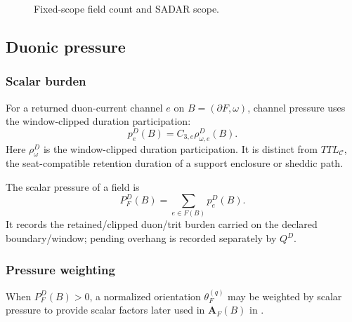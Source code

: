 \begin{figure}[H]
\centering
{}
\caption{Fixed-scope field count and SADAR scope.}
\label{fig:field-count}
\end{figure}


\subsection{Duonic pressure}
\label{sec:duonic-pressure-inertia}

\subsubsection{Scalar burden}
\label{subsec:duonic-pressure-scalar-burden}
\begin{definition}
For a returned duon-current channel \(e\) on \(B=(\partial F,\omega)\), channel pressure uses the window-clipped duration participation:
\[
p^D_e(B)=C_{3,e}\rho^D_{\omega,e}(B).
\]
Here \(\rho^D_\omega\) is the window-clipped duration participation. It is distinct from \(TTL_{\mathcal C}\), the seat-compatible retention duration of a support enclosure or sheddic path.
\end{definition}
\begin{definition}
The scalar pressure of a field is
\begin{equation}
P^D_F(B)=
\sum_{e\in F(B)}p^D_e(B).
\label{eq:duonic-pressure}
\end{equation}
It records the retained/clipped duon/trit burden carried on the declared boundary/window; pending overhang is recorded separately by \(Q^D\).
\end{definition}

\subsubsection{Pressure weighting}
\label{subsec:duonic-pressure-weighting}
When \(P^D_F(B)>0\), a normalized orientation \(\theta_F^{(q)}\) may be weighted by scalar pressure to provide scalar factors later used in \(\mathbf A_F(B)\) in .

